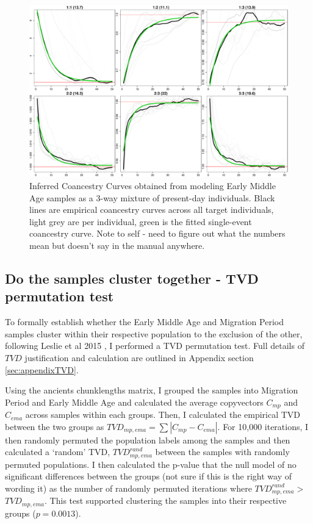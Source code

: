 \begin{figure}[htp]
    \centering
    \includegraphics[width=1.0\textwidth]{../images/chapter5/EarlyMiddleAges_3way_acoanc.pdf}
    \caption{Inferred Coancestry Curves obtained from modeling Early Middle Age samples as a 3-way mixture of present-day individuals. Black lines are empirical coancestry curves across all target individuals, light grey are per individual, green is the fitted single-event coancestry curve. Note to self - need to figure out what the numbers mean but doesn't say in the manual anywhere.}
    \label{fig:EarlyMiddleAges_MOSAIC_3way_moderns_acoanc}
\end{figure}


\subsection{Do the samples cluster together - TVD permutation test} \label{sec:TVD_test}

To formally establish whether the Early Middle Age and Migration Period samples cluster within their respective population to the exclusion of the other, following Leslie et al 2015 \cite{Leslie2015}, I performed a TVD permutation test. Full details of $TVD$ justification and calculation are outlined in Appendix section \ref{sec:appendixTVD}.

Using the ancients chunklengths matrix, I grouped the samples into Migration Period and Early Middle Age and  calculated the average copyvectors $C_{mp}$ and $C_{ema}$ across samples within each groups. Then, I calculated the empirical TVD between the two groups as $TVD_{mp,ema} = \sum |C_{mp} - C_{ema}|$. For 10,000 iterations, I then randomly permuted the population labels among the samples and then calculated a `random' TVD, $TVD_{mp,ema}^{rand}$ between the samples with randomly permuted populations. I then calculated the p-value that the null model of no significant differences between the groups (not sure if this is the right way of wording it) as the number of randomly permuted iterations where $TVD_{mp,ema}^{rand} > $ $TVD_{mp,ema}$. This test supported clustering the samples into their respective groups ($p=0.0013$).

